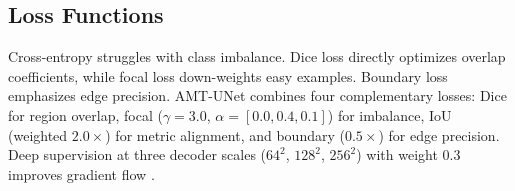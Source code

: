 \subsection{Loss Functions}

Cross-entropy struggles with class imbalance. Dice loss \cite{milletari2016vnet} directly optimizes overlap coefficients, while focal loss \cite{lin2017focal} down-weights easy examples. Boundary loss \cite{kervadec2019boundary} emphasizes edge precision. AMT-UNet combines four complementary losses: Dice for region overlap, focal ($\gamma=3.0$, $\alpha=[0.0, 0.4, 0.1]$) for imbalance, IoU (weighted $2.0\times$) for metric alignment, and boundary ($0.5\times$) for edge precision. Deep supervision at three decoder scales ($64^2$, $128^2$, $256^2$) with weight 0.3 improves gradient flow \cite{lee2015deeply}.
